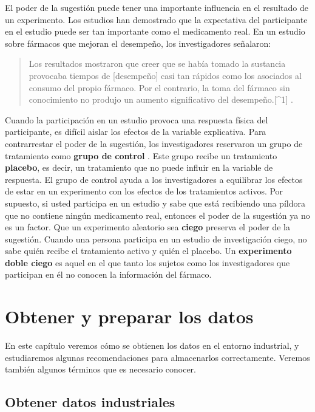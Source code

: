 \documentclass[
  letterpaper,
]{scrbook}
\begin{document}
El poder de la sugestión puede tener una importante influencia en el
resultado de un experimento. Los estudios han demostrado que la
expectativa del participante en el estudio puede ser tan importante como
el medicamento real. En un estudio sobre fármacos que mejoran el
desempeño, los investigadores señalaron:

\begin{quote}
Los resultados mostraron que creer que se había tomado la sustancia
provocaba tiempos de {[}desempeño{]} casi tan rápidos como los asociados
al consumo del propio fármaco. Por el contrario, la toma del fármaco sin
conocimiento no produjo un aumento significativo del
desempeño.{[}\^{}1{]} .
\end{quote}

Cuando la participación en un estudio provoca una respuesta física del
participante, es difícil aislar los efectos de la variable explicativa.
Para contrarrestar el poder de la sugestión, los investigadores
reservaron un grupo de tratamiento como \textbf{grupo de control} . Este
grupo recibe un tratamiento \textbf{placebo}, es decir, un tratamiento
que no puede influir en la variable de respuesta. El grupo de control
ayuda a los investigadores a equilibrar los efectos de estar en un
experimento con los efectos de los tratamientos activos. Por supuesto,
si usted participa en un estudio y sabe que está recibiendo una píldora
que no contiene ningún medicamento real, entonces el poder de la
sugestión ya no es un factor. Que un experimento aleatorio sea
\textbf{ciego} preserva el poder de la sugestión. Cuando una persona
participa en un estudio de investigación ciego, no sabe quién recibe el
tratamiento activo y quién el placebo. Un \textbf{experimento doble
ciego} es aquel en el que tanto los sujetos como los investigadores que
participan en él no conocen la información del fármaco.


\hypertarget{obtener-y-preparar-los-datos}{%
\chapter{Obtener y preparar los
datos}\label{obtener-y-preparar-los-datos}}

En este capítulo veremos cómo se obtienen los datos en el entorno
industrial, y estudiaremos algunas recomendaciones para almacenarlos
correctamente. Veremos también algunos términos que es necesario
conocer.

\hypertarget{obtener-datos-industriales}{%
\section{Obtener datos industriales}\label{obtener-datos-industriales}}
\end{document}
